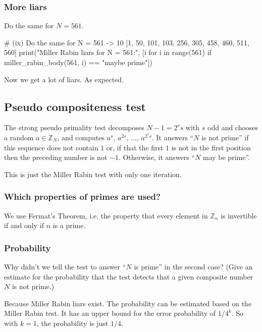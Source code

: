 \documentclass{article}
\newcommand{\Z}{\mathbb{Z}}
\begin{document}
  \subsubsection{More liars}
  \begin{centerframebox}
    Do the same for $N = 561$.
  \end{centerframebox}
  \begin{mylisting}
    # (ix) Do the same for N = 561  -> 10  [1, 50, 101, 103, 256, 305, 458, 460, 511, 560]
    print("Miller Rabin liars for N = 561:", [i for i in range(561) if miller_rabin_body(561, i) == "maybe prime"])
  \end{mylisting}
  Now we get a lot of liars. As expected.

  \subsection{Pseudo compositeness test}
  \begin{centerframebox}
    The strong pseudo primality test decomposes $N - 1 = 2^r s$ with $s$ odd and chooses a random $a \in \Z_N$,
    and computes $a^s,\, a^{2s},\, \dots,\, a^{2^r s}$.
    It answers ``$N$ is not prime'' if this sequence does not contain $1$ or, if that the first $1$ is not
    in the first position then the preceding number is not $-1$. Otherwise, it answers ``$N$ may be prime''.
  \end{centerframebox}
  This is just the Miller Rabin test with only one iteration.

  \subsubsection{Which properties of primes are used?}
  We use Fermat's Theorem, i.e. the property that every element in $\Z_n$ is invertible if and only if $n$ is a prime.

  \subsubsection{Probability}
  \begin{centerframebox}
    Why didn't we tell the test to answer ``$N$ is prime'' in the second
    case? (Give an estimate for the probability that the test detects that a
    given composite number $N$ is not prime.)
  \end{centerframebox}
  Because Miller Rabin liars exist.
  The probability can be estimated based on the Miller Rabin test.
  It has an upper bound for the error probability of $1/4^k$.
  So with $k=1$, the probability is just $1/4$.
\end{document}
